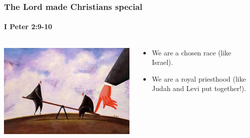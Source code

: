 \begin{frame}
	\frametitle{The Lord made Christians special}
	\framesubtitle{I Peter 2:9-10}
	\begin{columns}[T]
	\begin{column}{0.5\textwidth}
		\begin{center}
		\includegraphics[width=\columnwidth]{figures/unfairAdvantage.jpg}
		\end{center}
	\end{column}
	\begin{column}{0.5\textwidth}
		\begin{itemize}
		\item We are a chosen race (like Israel).
		\item We are a royal priesthood (like Judah and Levi put together!).
		\end{itemize}
	\end{column}
	\end{columns}
	
\end{frame}

